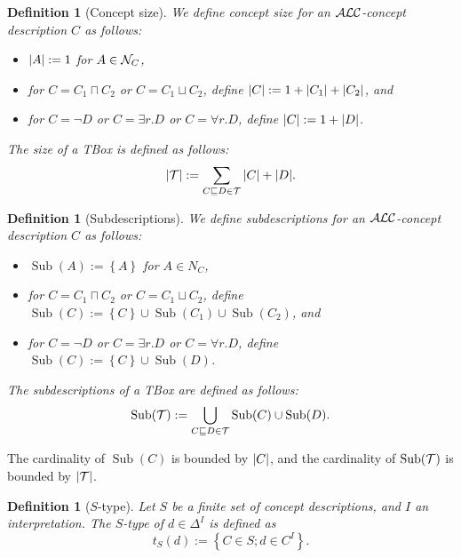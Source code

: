 \documentclass[openany]{scrbook}
\theoremstyle{break}
\newtheorem{Definition}[Theorem]{Definition}
\theoremstyle{nonumberbreak}
\theoremstyle{nonumberplain}
\theoremstyle{nonumberbreak}
\newcommand{\then}{\Longrightarrow}
\newcommand{\abs}[2][]{\left|{#2}\right|\ifx#1\then\else_{#1}\fi}
\newcommand{\set}[1]{\left\{#1\right\}}
\newcommand{\Sub}{\operatorname{Sub}}
\newcommand{\ALC}{{\cal A}{\cal L}{\cal C}}
\begin{document}
\begin{Definition}[Concept size]
  We define concept size for an $\ALC$-concept description $C$ as
  follows:
  \begin{itemize}
  \item $\abs{A} := 1$ for $A \in {\cal N}_C$,
  \item for $C = C_1 \sqcap C_2$ or $C = C_1 \sqcup C_2$, define
    $\abs{C} := 1 + \abs{C_1} + \abs{C_2}$, and
  \item for $C = \neg D$ or $C = \exists r.D$ or $C = \forall r.D$,
    define $\abs{C} := 1 + \abs{D}$.
  \end{itemize}

  The size of a TBox is defined as follows:
  \begin{equation*}
    \abs{{\cal T}} := \sum_{C \sqsubseteq D \in {\cal T}}{\abs{C} + \abs{D}}.
  \end{equation*}
\end{Definition}

\begin{Definition}[Subdescriptions]
  We define subdescriptions for an $\ALC$-concept description $C$ as
  follows:
  \begin{itemize}
  \item $\Sub(A) := \set{A}$ for $A \in N_C$,
  \item for $C = C_1 \sqcap C_2$ or $C = C_1 \sqcup C_2$, define
    $\Sub(C) := \set{C} \cup \Sub(C_1) \cup \Sub(C_2)$, and
  \item for $C = \neg D$ or $C = \exists r.D$ or $C = \forall r.D$,
    define $\Sub(C) := \set{C} \cup \Sub(D)$.
  \end{itemize}

  The subdescriptions of a TBox are defined as follows:
  \begin{equation*}
    \Sub({\cal T}) := \bigcup_{C \sqsubseteq D \in {\cal T}}{\Sub(C)
      \cup \Sub(D)}.
  \end{equation*}
\end{Definition}

The cardinality of $\Sub(C)$ is bounded by $\abs{C}$, and the
cardinality of $\Sub({\cal T})$ is bounded by $\abs{{\cal T}}$.

\begin{Definition}[$S$-type]
  \label{3.13}
  Let $S$ be a finite set of concept descriptions, and $I$ an
  interpretation. The $S$-type of $d \in \Delta^I$ is defined as
  \begin{equation*}
    t_S(d) := \set{C \in S; d \in C^I}.
  \end{equation*}
\end{Definition}
\end{document}
